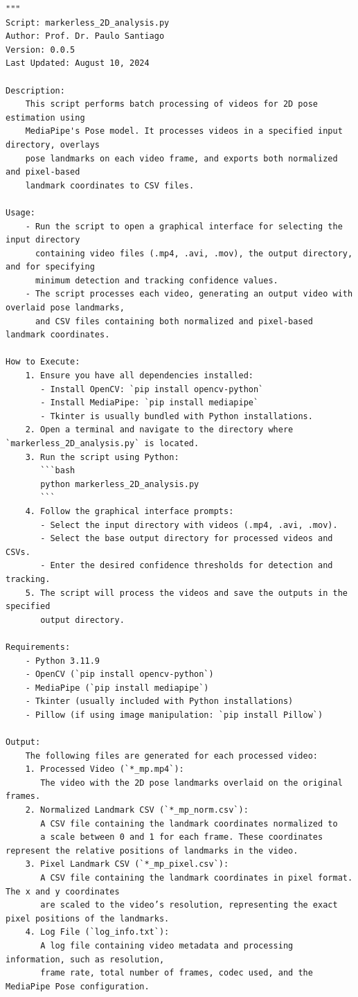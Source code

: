 \documentclass{article}
\begin{document}
\scriptsize
\begin{verbatim}
"""
Script: markerless_2D_analysis.py
Author: Prof. Dr. Paulo Santiago
Version: 0.0.5
Last Updated: August 10, 2024

Description:
    This script performs batch processing of videos for 2D pose estimation using 
    MediaPipe's Pose model. It processes videos in a specified input directory, overlays 
    pose landmarks on each video frame, and exports both normalized and pixel-based 
    landmark coordinates to CSV files.

Usage:
    - Run the script to open a graphical interface for selecting the input directory 
      containing video files (.mp4, .avi, .mov), the output directory, and for specifying 
      minimum detection and tracking confidence values.
    - The script processes each video, generating an output video with overlaid pose landmarks, 
      and CSV files containing both normalized and pixel-based landmark coordinates.

How to Execute:
    1. Ensure you have all dependencies installed:
       - Install OpenCV: `pip install opencv-python`
       - Install MediaPipe: `pip install mediapipe`
       - Tkinter is usually bundled with Python installations.
    2. Open a terminal and navigate to the directory where `markerless_2D_analysis.py` is located.
    3. Run the script using Python:
       ```bash
       python markerless_2D_analysis.py
       ```
    4. Follow the graphical interface prompts:
       - Select the input directory with videos (.mp4, .avi, .mov).
       - Select the base output directory for processed videos and CSVs.
       - Enter the desired confidence thresholds for detection and tracking.
    5. The script will process the videos and save the outputs in the specified 
       output directory.

Requirements:
    - Python 3.11.9
    - OpenCV (`pip install opencv-python`)
    - MediaPipe (`pip install mediapipe`)
    - Tkinter (usually included with Python installations)
    - Pillow (if using image manipulation: `pip install Pillow`)

Output:
    The following files are generated for each processed video:
    1. Processed Video (`*_mp.mp4`): 
       The video with the 2D pose landmarks overlaid on the original frames.
    2. Normalized Landmark CSV (`*_mp_norm.csv`):
       A CSV file containing the landmark coordinates normalized to 
       a scale between 0 and 1 for each frame. These coordinates represent the relative positions of landmarks in the video.
    3. Pixel Landmark CSV (`*_mp_pixel.csv`):
       A CSV file containing the landmark coordinates in pixel format. The x and y coordinates 
       are scaled to the video’s resolution, representing the exact pixel positions of the landmarks.
    4. Log File (`log_info.txt`):
       A log file containing video metadata and processing information, such as resolution, 
       frame rate, total number of frames, codec used, and the MediaPipe Pose configuration.


\end{verbatim}
\end{document}
